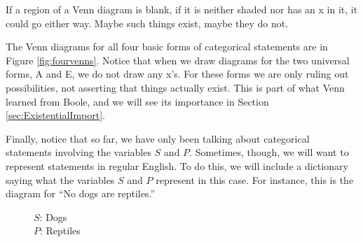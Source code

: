 If a region of a Venn diagram is blank, if it is neither shaded nor has an x in it, it could go either way. Maybe such things exist, maybe they do not.

The Venn diagrams for all four basic forms of categorical statements are in Figure \ref{fig:fourvenns}. Notice that when we draw diagrams for the two universal forms, A and E, we do not draw any x's. For these forms we are only ruling out possibilities, not asserting that things actually exist. This is part of what Venn learned from Boole, and we will see its importance in Section \ref{sec:ExistentialImport}. 

Finally, notice that so far, we have only been talking about categorical statements involving the variables $S$ and $P$. Sometimes, though, we will want to represent statements in regular English. To do this, we will include a dictionary saying what the variables $S$ and $P$ represent in this case. For instance, this is the diagram for ``No dogs are reptiles.''

\begin{figure}[H]
\begin{center}
\captionsetup{singlelinecheck=on}
\caption*{$S$: Dogs \\ $P$: Reptiles}
\end{center}
\end{figure}



